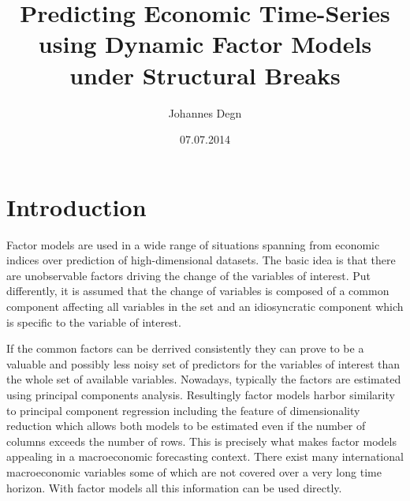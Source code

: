 \documentclass[12pt]{article}
\title{\textbf{Predicting Economic Time-Series using Dynamic Factor Models under Structural Breaks}}
\author{Johannes Degn}
\date{07.07.2014}
\begin{document}
\maketitle
\thispagestyle{empty}
\setcounter{page}{1}

\newpage
\tableofcontents
\newpage

\cleardoublepage
{}
\listoffigures
\cleardoublepage
{}
\listoftables
\newpage



\section{Introduction}
Factor models are used in a wide range of situations spanning from economic indices over prediction of high-dimensional datasets. The basic idea is that there are unobservable factors driving the change of the variables of interest. Put differently, it is assumed that the change of variables is composed of a common component affecting all variables in the set and an idiosyncratic component which is specific to the variable of interest.

If the common factors can be derrived consistently they can prove to be a valuable and possibly less noisy set of predictors for the variables of interest than the whole set of available variables. Nowadays, typically the factors are estimated using principal components analysis. Resultingly factor models harbor similarity to principal component regression including the feature of dimensionality reduction which allows both models to be estimated even if the number of columns exceeds the number of rows. This is precisely what makes factor models appealing in a macroeconomic forecasting context. There exist many international macroeconomic variables some of which are not covered over a very long time horizon. With factor models all this information can be used directly.
\end{document}

